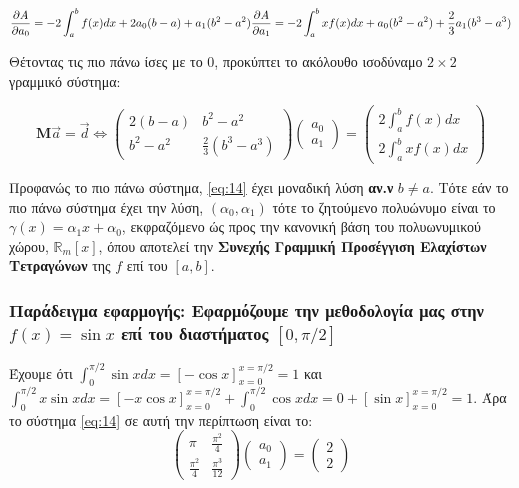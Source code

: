 \documentclass[12pt]{article}
\begin{document}
\[
\frac{\partial A}{\partial a_0} = -2\int_a^b f(x)dx+2a_0(b-a)+a_1(b^2-a^2) \\
\frac{\partial A}{\partial a_1} = -2\int_a^b xf(x)dx+a_0(b^2-a^2)+\frac{2}{3} a_1(b^3-a^3) \nonumber
\]

Θέτοντας τις πιο πάνω ίσες με το 0, προκύπτει το ακόλουθο ισοδύναμο
\(2 \times 2\) γραμμικό σύστημα:

\[
\mathbf{M}\vec{a}=\vec{d} \Leftrightarrow \tag{8} \label{eq:14}
\begin{pmatrix}
2(b-a) & b^2-a^2 \\
b^2-a^2 & \frac{2}{3}(b^3-a^3)
\end{pmatrix}
\begin{pmatrix}
a_0 \\
a_1
\end{pmatrix}
=
\begin{pmatrix}
2\int_a^b f(x)dx \\
2\int_a^b xf(x)dx
\end{pmatrix}
\]

Προφανώς το πιο πάνω σύστημα, \eqref{eq:14} έχει μοναδική λύση \textbf{αν.ν}
\(b \neq a\). Τότε εάν το πιο πάνω σύστημα έχει την λύση,
\((\alpha_0,\alpha_1)\) τότε το ζητούμενο πολυώνυμο είναι το
\(\gamma (x)=\alpha_1 x+\alpha_0\), εκφραζόμενο ώς προς την κανονική
βάση του πολυωνυμικού χώρου, \(\mathbb{R}_m[x]\), όπου αποτελεί την
\textbf{Συνεχής Γραμμική Προσέγγιση Ελαχίστων Τετραγώνων} της \(f\) επί
του \([a,b]\).

\subsubsection{Παράδειγμα εφαρμογής: Εφαρμόζουμε την
μεθοδολογία μας στην \(f(x)=\sin{x}\) επί του διαστήματος
\([0,\pi/2]\)}

Έχουμε ότι \(\int_0^{\pi/2} \sin{x}dx = [-\cos{x}]_{x=0}^{x=\pi/2} = 1\)
και
\(\int_0^{\pi/2} x\sin{x}dx = [-x\cos{x}]_{x=0}^{x=\pi/2} + \int_0^{\pi/2} \cos{x}dx = 0 + [\sin{x}]_{x=0}^{x=\pi/2} = 1\).
Άρα το σύστημα \eqref{eq:14} σε αυτή την περίπτωση είναι το: \[
\begin{pmatrix}
\pi & \frac{\pi^2}{4} \\
\frac{\pi^2}{4} & \frac{\pi^3}{12}
\end{pmatrix}
\begin{pmatrix}
a_0 \\
a_1
\end{pmatrix}
=
\begin{pmatrix}
2 \\
2
\end{pmatrix} \nonumber
\]
\end{document}
